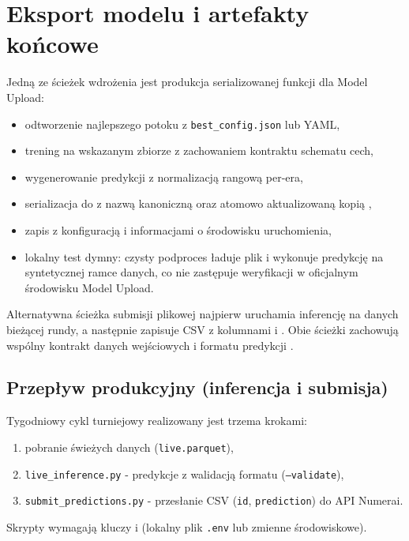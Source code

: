 \documentclass[12pt,a4paper]{report}
\newcommand{\sourcecite}[1]{\autocite{#1}}
\begin{document}
\section{Eksport modelu i artefakty końcowe}
Jedną ze ścieżek wdrożenia jest produkcja serializowanej funkcji dla Model Upload:
\begin{itemize}\item odtworzenie najlepszego potoku z \texttt{best\_config.json} lub YAML,
\item trening na wskazanym zbiorze z zachowaniem kontraktu schematu cech,
\item wygenerowanie predykcji z normalizacją rangową per-era,
\item serializacja do  z nazwą kanoniczną
    oraz atomowo aktualizowaną kopią ,
\item zapis  z konfiguracją i informacjami o środowisku
    uruchomienia,
\item lokalny test dymny: czysty podproces ładuje plik i wykonuje predykcję
    na syntetycznej ramce danych, co nie zastępuje weryfikacji w oficjalnym
    środowisku Model Upload.\end{itemize}

Alternatywna ścieżka submisji plikowej najpierw uruchamia inferencję na danych
bieżącej rundy, a następnie zapisuje CSV z kolumnami  i .
Obie ścieżki zachowują wspólny kontrakt danych wejściowych i formatu predykcji
\sourcecite{numerai-submissions,numerai-model-upload}.

\subsection{Przepływ produkcyjny (inferencja i submisja)}
Tygodniowy cykl turniejowy realizowany jest trzema krokami:
\begin{enumerate}\item pobranie świeżych danych (\texttt{live.parquet}),
\item \texttt{live\_inference.py} - predykcje z walidacją formatu (\texttt{--validate}),
\item \texttt{submit\_predictions.py} - przesłanie CSV (\texttt{id}, \texttt{prediction}) do API Numerai.\end{enumerate}
Skrypty wymagają kluczy  i
(lokalny plik \texttt{.env} lub zmienne środowiskowe).
\end{document}
